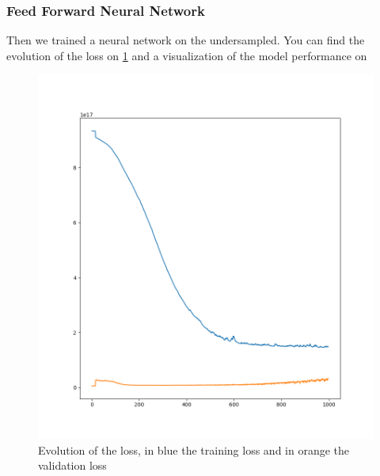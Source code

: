 \documentclass[a4paper, 12pt, one column]{article}
\begin{document}
\subsubsection{Feed Forward Neural Network}

Then we trained a neural network on the undersampled. You can find the evolution of the loss on \cref{fig:loss_reg} and a visualization of the model performance on 

\begin{figure}[H]
\centering
\includegraphics[scale=0.5]{loss_reg.png}
\caption{Evolution of the loss, in blue the training loss and in orange the validation loss}
\label{fig:loss_reg}
\end{figure}
\end{document}
